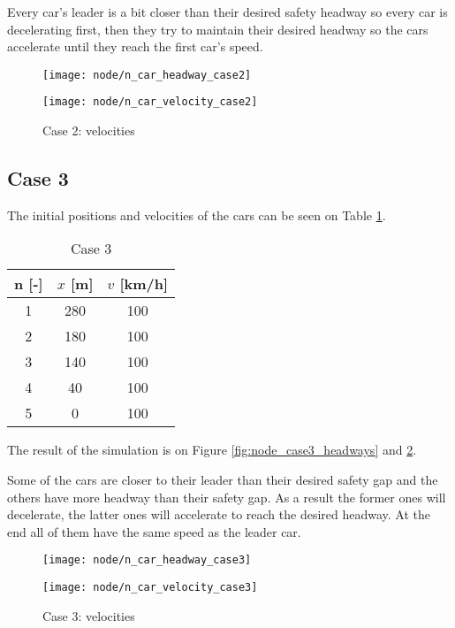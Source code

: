 		Every car's leader is a bit closer than their desired safety headway so every car is decelerating first, then they try to maintain their desired headway so the cars accelerate until they reach the first car's speed.
		\begin{figure}
			\centering
			\begin{minipage}{.5\textwidth}
				\centering
				\texttt{[image: node/n\_car\_headway\_case2]}
				\caption{Case 2: headways}
				\label{fig:node_case2_headways}
			\end{minipage}\hfill
			\begin{minipage}{.5\textwidth}
				\centering
				\texttt{[image: node/n\_car\_velocity\_case2]}
				\caption{Case 2: velocities}
				\label{fig:node_case2_velocities}
			\end{minipage}
		\end{figure}
		\subsection*{Case 3}
		The initial positions and velocities of the cars can be seen on Table \ref{tab:node_case3}.
		\begin{table}
			\centering
			\begin{tabular}{ |c|c|c| }
				\hline
				n [-] & $x$ [m] & $v$ [km/h]\\
				\hline
				1 &  280 & 100 \\
				2 & 180 & 100 \\
				3 & 140 & 100 \\
				4 & 40 & 100 \\
				5 & 0 & 100 \\
				\hline
			\end{tabular}
			\caption{Case 3}
			\label{tab:node_case3}
		\end{table}
		The result of the simulation is on  Figure \ref{fig:node_case3_headways} and \ref{fig:node_case3_velocities}. 

		Some of the cars are closer to their leader than their desired safety gap and the others have more headway than their safety gap. As a result the former ones will decelerate, the latter ones will accelerate to reach the desired headway. At the end all of them have the same speed as the leader car.
		\begin{figure}
			\centering
			\begin{minipage}{.5\textwidth}
				\centering
				\texttt{[image: node/n\_car\_headway\_case3]}
				\caption{Case 3: headways}
				\label{fig:node_case3_headways}
			\end{minipage}\hfill
			\begin{minipage}{.5\textwidth}
				\centering
				\texttt{[image: node/n\_car\_velocity\_case3]}
				\caption{Case 3: velocities}
				\label{fig:node_case3_velocities}
			\end{minipage}
		\end{figure}
